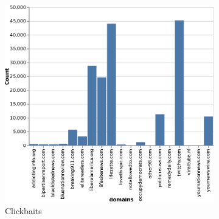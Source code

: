 \begin{figure}[h]
     \centering
     \begin{subfigure}[b]{0.3\textwidth}
         \centering
         \includegraphics[width=\textwidth, height=0.3\textheight]{chapter/images/data_exploration/clickbait.eps}
         \caption{Clickbaits}
     \end{subfigure}
     \hfill
     \begin{subfigure}[b]{0.3\textwidth}
         \centering

\end{subfigure}
\end{figure}
